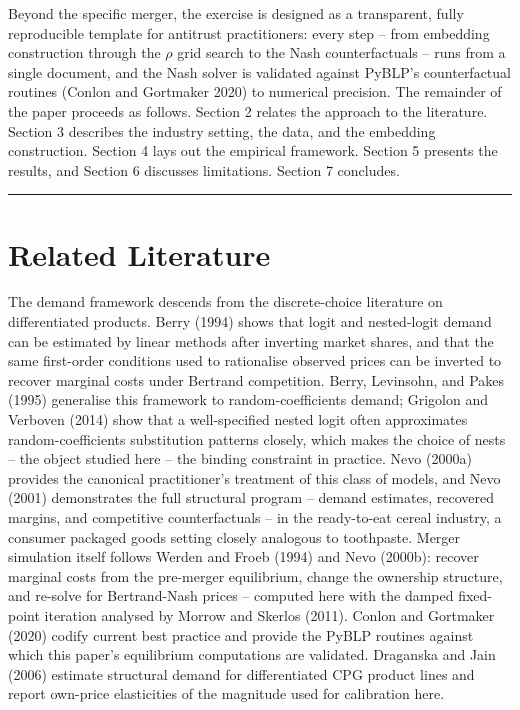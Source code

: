 Beyond the specific merger, the exercise is designed as a transparent,
fully reproducible template for antitrust practitioners: every step --
from embedding construction through the \(\rho\) grid search to the Nash
counterfactuals -- runs from a single document, and the Nash solver is
validated against PyBLP's counterfactual routines (Conlon and Gortmaker
2020) to numerical precision. The remainder of the paper proceeds as
follows. Section 2 relates the approach to the literature. Section 3
describes the industry setting, the data, and the embedding
construction. Section 4 lays out the empirical framework. Section 5
presents the results, and Section 6 discusses limitations. Section 7
concludes.

\begin{center}\rule{0.5\linewidth}{0.5pt}\end{center}

\chapter{Related Literature}\label{related-literature}

The demand framework descends from the discrete-choice literature on
differentiated products. Berry (1994) shows that logit and nested-logit
demand can be estimated by linear methods after inverting market shares,
and that the same first-order conditions used to rationalise observed
prices can be inverted to recover marginal costs under Bertrand
competition. Berry, Levinsohn, and Pakes (1995) generalise this
framework to random-coefficients demand; Grigolon and Verboven (2014)
show that a well-specified nested logit often approximates
random-coefficients substitution patterns closely, which makes the
choice of nests -- the object studied here -- the binding constraint in
practice. Nevo (2000a) provides the canonical practitioner's treatment
of this class of models, and Nevo (2001) demonstrates the full
structural program -- demand estimates, recovered margins, and
competitive counterfactuals -- in the ready-to-eat cereal industry, a
consumer packaged goods setting closely analogous to toothpaste. Merger
simulation itself follows Werden and Froeb (1994) and Nevo (2000b):
recover marginal costs from the pre-merger equilibrium, change the
ownership structure, and re-solve for Bertrand-Nash prices -- computed
here with the damped fixed-point iteration analysed by Morrow and
Skerlos (2011). Conlon and Gortmaker (2020) codify current best practice
and provide the PyBLP routines against which this paper's equilibrium
computations are validated. Draganska and Jain (2006) estimate
structural demand for differentiated CPG product lines and report
own-price elasticities of the magnitude used for calibration here.

